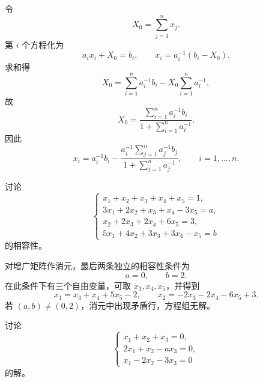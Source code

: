 \begin{solution}
令
\begin{equation}
 X_0=\sum_{j=1}^n x_j.
\end{equation}
第 $i$ 个方程化为
\begin{equation}
 a_i x_i+X_0=b_i,
 \qquad
 x_i=a_i^{-1}(b_i-X_0).
\end{equation}
求和得
\begin{equation}
 X_0=\sum_{i=1}^n a_i^{-1}b_i-X_0\sum_{i=1}^n a_i^{-1},
\end{equation}
故
\begin{equation}
 X_0=\frac{\sum_{i=1}^n a_i^{-1}b_i}
 {1+\sum_{i=1}^n a_i^{-1}}.
\end{equation}
因此
\begin{equation}
 x_i=a_i^{-1}b_i-
 \frac{a_i^{-1}\sum_{j=1}^n a_j^{-1}b_j}
 {1+\sum_{j=1}^n a_j^{-1}},
 \qquad i=1,\ldots,n.
\end{equation}
\end{solution}

\begin{exercise}[含参数非齐次方程组]
讨论
\begin{equation}
\begin{cases}
 x_1+x_2+x_3+x_4+x_5=1,\\
 3x_1+2x_2+x_3+x_4-3x_5=a,\\
 x_2+2x_3+2x_4+6x_5=3,\\
 5x_1+4x_2+3x_3+3x_4-x_5=b
\end{cases}
\end{equation}
的相容性。
\end{exercise}

\begin{solution}
对增广矩阵作消元，最后两条独立的相容性条件为
\begin{equation}
 a=0,
 \qquad b=2.
\end{equation}
在此条件下有三个自由变量，可取 $x_3,x_4,x_5$，并得到
\begin{equation}
 x_1=x_3+x_4+5x_5-2,
 \qquad
 x_2=-2x_3-2x_4-6x_5+3.
\end{equation}
若 $(a,b)\neq(0,2)$，消元中出现矛盾行，方程组无解。
\end{solution}

\begin{exercise}[含参数齐次方程组]
讨论
\begin{equation}
\begin{cases}
 x_1+x_2+x_3=0,\\
 2x_1+x_2-a x_3=0,\\
 x_1-2x_2-3x_3=0
\end{cases}
\end{equation}
的解。
\end{exercise}


